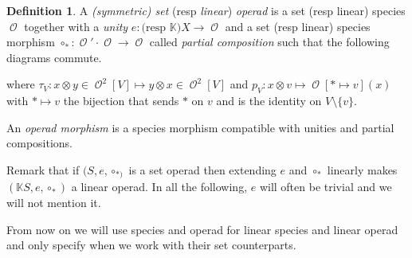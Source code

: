 \documentclass[a4paper]{article}
\DeclareMathOperator{\id}{id}
\DeclareMathOperator{\op}{\mathcal{O}}
\theoremstyle{definition}
\newtheorem{definition}{Definition}
\newcommand{\K}{\mathbb{K}}
\begin{document}
\begin{definition}
\label{op}
A \textit{(symmetric) set} (resp \textit{linear}) \textit{operad} is a set
(resp linear) species $\op$ together with a \textit{unity} $e: \text{(resp $\K$)}X\rightarrow \op$
and a set (resp linear) species morphism $\circ_{\ast}:\op'\cdot\op\rightarrow \op$ called
\textit{partial composition} such that the following diagrams commute.
\begin{center}
\end{center}
\begin{center}
\end{center}
where $\tau_V:x\otimes y\in \op^2[V] \mapsto y\otimes x\in \op^2[V]$ and
$p_V: x\otimes v \mapsto \op[\ast\mapsto v](x)$ with $\ast\mapsto v$ the
bijection that sends $\ast$ on $v$ and is the identity on $V\setminus\{v\}$.

An \textit{operad morphism} is a species morphism compatible with unities and 
partial compositions.
\end{definition}

Remark that if $(S,e,\circ_{\ast)}$ is a set operad then extending $e$ and
$\circ_{\ast}$ linearly makes $(\K S,e,\circ_{\ast})$ a linear operad. In all
the following, $e$ will often be trivial and we will not mention it.

From now on we will use species and operad for linear species 
and linear operad and only specify when we work with their set
counterparts.
\end{document}
